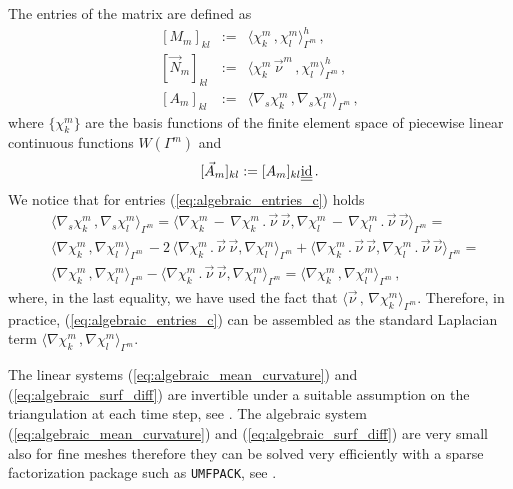 The entries of the matrix are defined as
\begin{eqnarray}
\left[ M_m \right]_{kl} & := & \langle \chi_k^m \, , \chi_l^m
\rangle_{\Gamma^m}^h\,,\label{eq:algebraic_entries_a} \\
\left[ \vec{N}_m \right]_{kl} & := & \langle \chi_k^m \, \vec{\nu}^m\,,
\chi_l^m \rangle_{\Gamma^m}^h\,,\label{eq:algebraic_entries_b} \\
\left[ A_m \right]_{kl} & := & \langle \nabla_s \chi_k^m \, , \nabla_s
\chi_l^m \rangle_{\Gamma^m}\,,\label{eq:algebraic_entries_c}
\end{eqnarray}
where $\{\chi_k^m\}$ are the basis functions of the finite element space of
piecewise linear continuous functions $W(\Gamma^m)$ and
\begin{equation}\label{eq:algebraic_entries_d}
[\vec{A}_m]_{kl} := [A_m]_{kl} \mat \id\,.
\end{equation}
We notice that for entries (\ref{eq:algebraic_entries_c}) holds
\begin{equation}
\begin{split}
& \langle \nabla_s \chi_k^m \, , \nabla_s \chi_l^m \rangle_{\Gamma^m} = \langle
\nabla \chi_k^m \, -\,\nabla \chi_k^m\,.\,\vec \nu\,\vec\nu, \nabla
\chi_l^m \, -\,\nabla \chi_l^m\,.\,\vec \nu\,\vec\nu\rangle_{\Gamma^m} = \\
& \langle \nabla \chi_k^m \, , \nabla \chi_l^m \rangle_{\Gamma^m}\,
- 2\, \langle \nabla \chi_k^m \,.\,\vec\nu\,\vec\nu , \nabla \chi_l^m
\rangle_{\Gamma^m}
+\langle \nabla \chi_k^m \,.\,\vec\nu\,\vec\nu , \nabla \chi_l^m
\,.\,\vec\nu\,\vec\nu \rangle_{\Gamma^m} = \\
& \langle \nabla \chi_k^m \, , \nabla \chi_l^m \rangle_{\Gamma^m}
- \langle \nabla \chi_k^m \,.\,\vec\nu\,\vec\nu , \nabla \chi_l^m
\rangle_{\Gamma^m} =
\langle \nabla \chi_k^m \, , \nabla \chi_l^m \rangle_{\Gamma^m}\,,
\end{split}
\end{equation}
where, in the last equality, we have used the fact that $\langle \vec
\nu\,,\,\nabla \chi_k^m  \rangle_{\Gamma^m}$. Therefore, in practice,
(\ref{eq:algebraic_entries_c}) can be assembled as the standard Laplacian
term $\langle \nabla \chi_k^m \, , \nabla \chi_l^m \rangle_{\Gamma^m}$.

The linear systems (\ref{eq:algebraic_mean_curvature}) and
(\ref{eq:algebraic_surf_diff}) are invertible under a suitable assumption on the
triangulation at each time step, see \cite{gflows3d}. The algebraic system
(\ref{eq:algebraic_mean_curvature}) and (\ref{eq:algebraic_surf_diff}) are
very small also for fine meshes therefore they can be solved very efficiently
with a sparse factorization package such as \verb|UMFPACK|, see \cite{Davis04}.

